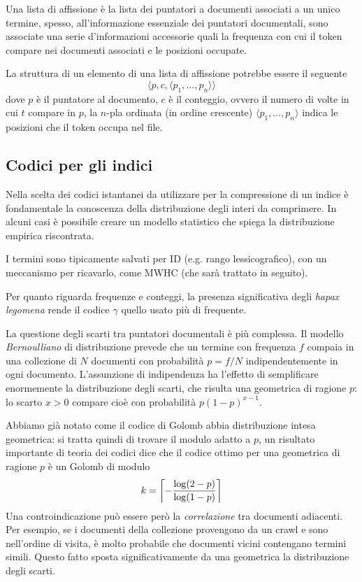 Una lista di affissione è la lista dei puntatori a documenti associati a un unico termine, spesso, all'informazione essenziale dei puntatori documentali, sono associate una serie d'informazioni accessorie quali la frequenza con cui il token compare nei documenti associati e le posizioni occupate.

La struttura di un elemento di una lista di affissione potrebbe essere il seguente
\begin{equation*}
    \langle p, c, \langle p_1, \dots, p_n \rangle \rangle
\end{equation*} 
dove $p$ è il puntatore al documento, $c$ è il conteggio, ovvero il numero di volte in cui $t$ compare in $p$, la $n$-pla ordinata (in ordine crescente) $\langle p_1, \dots, p_n \rangle$ indica le posizioni che il token occupa nel file.
\subsection{Codici per gli indici}
Nella scelta dei codici istantanei da utilizzare per la compressione di un indice è fondamentale la conoscenza della distribuzione degli interi da comprimere. In alcuni casi è possibile creare un modello statistico che spiega la distribuzione empirica riscontrata.

I termini sono tipicamente salvati per ID (e.g. rango lessicografico), con un meccanismo per ricavarlo, come MWHC (che sarà trattato in seguito).

Per quanto riguarda frequenze e conteggi, la presenza significativa degli \textit{hapax legomena} rende il codice $\gamma$ quello usato più di frequente.

La questione degli scarti tra puntatori documentali è più complessa. Il modello \textit{Bernoulliano} di distribuzione prevede che un termine con frequenza $f$ compaia in una collezione di $N$ documenti con probabilità $p = f / N$ indipendentemente in ogni documento. L'assunzione di indipendenza ha l'effetto di semplificare enormemente la distribuzione degli scarti, che risulta una geometrica di ragione $p$: lo scarto $x > 0$ compare cioè con probabilità $p(1 - p)^{x - 1}$.

Abbiamo già notato come il codice di Golomb abbia distribuzione intesa geometrica: si tratta quindi di trovare il modulo adatto a $p$, un risultato importante di teoria dei codici dice che il codice ottimo per una geometrica di ragione $p$ è un Golomb di modulo
\begin{equation}
    k = \left\lceil - \frac{\log(2 - p)}{\log(1 - p)} \right\rceil
\end{equation}
Una controindicazione può essere però la \textit{correlazione} tra documenti adiacenti. Per esempio, se i documenti della collezione provengono da un crawl e sono nell'ordine di visita, è molto probabile che documenti vicini contengano termini simili. Questo fatto sposta significativamente da una geometrica la distribuzione degli scarti.

